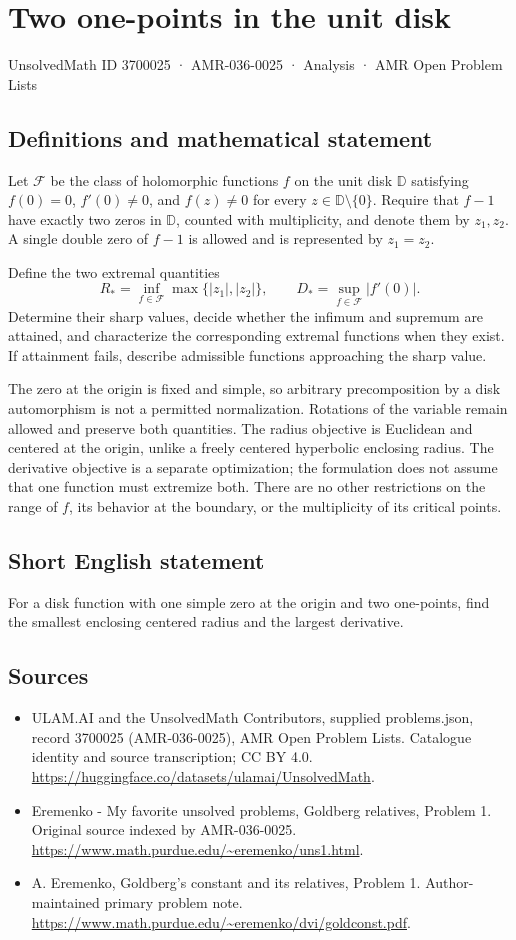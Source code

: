 \documentclass[11pt,a4paper]{article}
\begin{document}
\section*{Two one-points in the unit disk}\label{3700025}
{\small UnsolvedMath ID 3700025 · AMR-036-0025 · Analysis · AMR Open Problem Lists}
\subsection{Definitions and mathematical statement}
Let $\mathcal F$ be the class of holomorphic functions
$f$ on the unit disk $\mathbb D$ satisfying
$f(0)=0$, $f'(0)\ne0$, and $f(z)\ne0$ for every
$z\in\mathbb D\setminus\{0\}$. Require that $f-1$
have exactly two zeros in $\mathbb D$, counted with
multiplicity, and denote them by $z_1,z_2$.
A single double zero of $f-1$ is allowed and is
represented by $z_1=z_2$.

Define the two extremal quantities
\[
 R_*=\inf_{f\in\mathcal F}\max\{|z_1|,|z_2|\},
 \qquad
 D_*=\sup_{f\in\mathcal F}|f'(0)|.
\]
Determine their sharp values, decide whether the infimum
and supremum are attained, and characterize the
corresponding extremal functions when they exist.
If attainment fails, describe admissible functions approaching
the sharp value.

The zero at the origin is fixed and simple, so arbitrary
precomposition by a disk automorphism is not a permitted
normalization. Rotations of the variable remain allowed
and preserve both quantities. The radius objective is
Euclidean and centered at the origin, unlike a freely
centered hyperbolic enclosing radius.
The derivative objective is a separate optimization;
the formulation does not assume that one function must
extremize both. There are no other restrictions on the
range of $f$, its behavior at the boundary, or the
multiplicity of its critical points.
\subsection{Short English statement}
For a disk function with one simple zero at the origin and two one-points, find the smallest enclosing centered radius and the largest derivative.
\subsection{Sources}
\begin{itemize}
\item[S1] ULAM.AI and the UnsolvedMath Contributors, supplied problems.json, record 3700025 (AMR-036-0025), AMR Open Problem Lists. Catalogue identity and source transcription; CC BY 4.0.
\url{https://huggingface.co/datasets/ulamai/UnsolvedMath}.
\item[S2] Eremenko - My favorite unsolved problems, Goldberg relatives, Problem 1. Original source indexed by AMR-036-0025.
\url{https://www.math.purdue.edu/~eremenko/uns1.html}.
\item[S3] A. Eremenko, Goldberg's constant and its relatives, Problem 1. Author-maintained primary problem note.
\url{https://www.math.purdue.edu/~eremenko/dvi/goldconst.pdf}.
\end{itemize}
\end{document}
